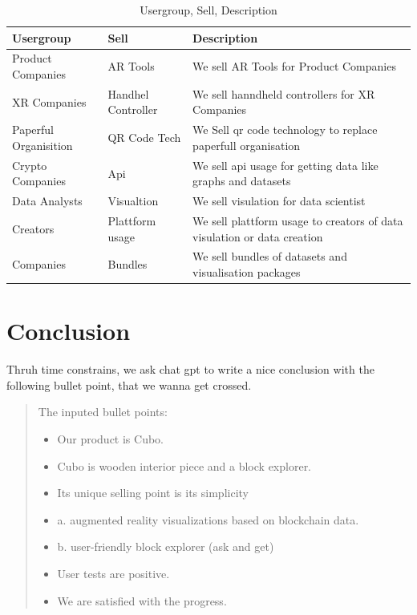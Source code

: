 \documentclass{report}
\begin{document}
\begin{table}[hbp]
	\centering
	\caption{Usergroup, Sell, Description}
	\label{tab:salesLong}
	\renewcommand{\arraystretch}{1.25}
	\begin{tabularx}{\textwidth}{p{3.5cm}|p{3cm}|p{4.5cm}}
		\hline
		\textbf{Usergroup}    & \textbf{Sell}      & \textbf{Description}                                                    \\
		\hline
		\hline
		Product Companies     & AR Tools           & We sell AR Tools for Product Companies                                  \\
		\hline
		XR Companies          & Handhel Controller & We sell hanndheld controllers for XR Companies                          \\
		\hline
		Paperful Organisition & QR Code Tech       & We Sell qr code technology to replace paperfull organisation            \\
		\hline
		Crypto Companies      & Api                & We sell api usage for getting data like graphs and datasets             \\
		\hline
		Data Analysts         & Visualtion         & We sell visulation for data scientist                                   \\
		\hline
		Creators              & Plattform usage    & We sell plattform usage to creators of data visulation or data creation \\
		\hline
		Companies             & Bundles            & We sell bundles of datasets and visualisation packages                  \\
		\hline
	\end{tabularx}
\end{table}

\newpage

\section{Conclusion}

Thruh time constrains, we ask chat gpt to write a nice conclusion with the following bullet point, that we wanna get crossed.

\begin{quote}
	The inputed bullet points:
	\begin{itemize}
		\item Our product is Cubo.
		\item Cubo is wooden interior piece and a block explorer.
		\item Its unique selling point is its simplicity
		\item a. augmented reality visualizations based on blockchain data.
		\item b. user-friendly block explorer (ask and get)
		\item User tests are positive.
		\item We are satisfied with the progress.
	\end{itemize}
\end{quote}
\end{document}
